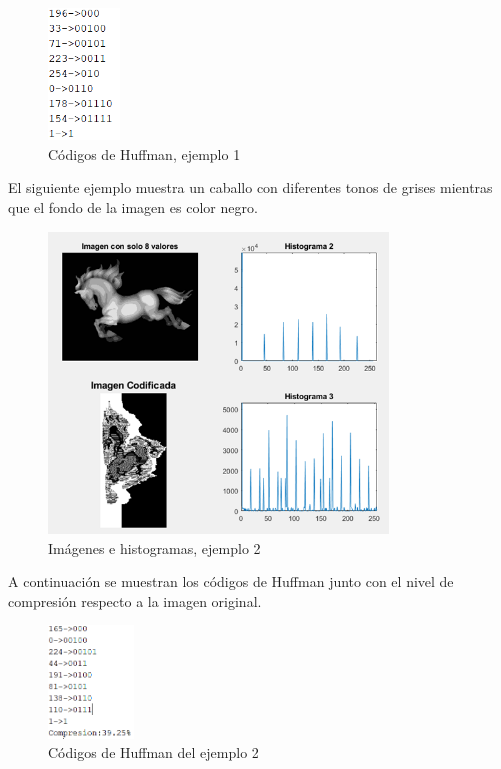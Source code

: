 \documentclass[12pt,twoside]{article}
\begin{document}
    \begin{figure}[H]
            \centering
            \includegraphics[height=3.5cm]{imagenes/a3.png}
            \caption{Códigos de Huffman, ejemplo 1}
        \end{figure}
    
    El siguiente ejemplo muestra un caballo con diferentes tonos de grises mientras que el fondo de la imagen es color negro.
    
    \begin{figure}[H]
            \centering
            \includegraphics[height=8cm]{imagenes/a4.png}
            \caption{Imágenes e histogramas, ejemplo 2}
        \end{figure}
    \newpage
    
    A continuación se muestran los códigos de Huffman junto con el nivel de compresión respecto a la imagen original.
    
    \begin{figure}[H]
            \centering
            \includegraphics[height=3cm]{imagenes/a7.png}
            \caption{Códigos de Huffman del ejemplo 2}
        \end{figure}
    
\end{document}
